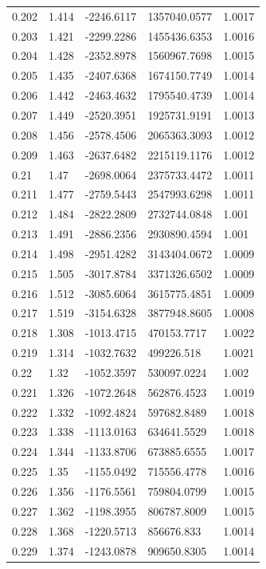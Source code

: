 \begin{tabular}{lllll}
0.202 & 1.414 & -2246.6117 & 1357040.0577 & 1.0017 \\
0.203 & 1.421 & -2299.2286 & 1455436.6353 & 1.0016 \\
0.204 & 1.428 & -2352.8978 & 1560967.7698 & 1.0015 \\
0.205 & 1.435 & -2407.6368 & 1674150.7749 & 1.0014 \\
0.206 & 1.442 & -2463.4632 & 1795540.4739 & 1.0014 \\
0.207 & 1.449 & -2520.3951 & 1925731.9191 & 1.0013 \\
0.208 & 1.456 & -2578.4506 & 2065363.3093 & 1.0012 \\
0.209 & 1.463 & -2637.6482 & 2215119.1176 & 1.0012 \\
0.21 & 1.47 & -2698.0064 & 2375733.4472 & 1.0011 \\
0.211 & 1.477 & -2759.5443 & 2547993.6298 & 1.0011 \\
0.212 & 1.484 & -2822.2809 & 2732744.0848 & 1.001 \\
0.213 & 1.491 & -2886.2356 & 2930890.4594 & 1.001 \\
0.214 & 1.498 & -2951.4282 & 3143404.0672 & 1.0009 \\
0.215 & 1.505 & -3017.8784 & 3371326.6502 & 1.0009 \\
0.216 & 1.512 & -3085.6064 & 3615775.4851 & 1.0009 \\
0.217 & 1.519 & -3154.6328 & 3877948.8605 & 1.0008 \\
0.218 & 1.308 & -1013.4715 & 470153.7717 & 1.0022 \\
0.219 & 1.314 & -1032.7632 & 499226.518 & 1.0021 \\
0.22 & 1.32 & -1052.3597 & 530097.0224 & 1.002 \\
0.221 & 1.326 & -1072.2648 & 562876.4523 & 1.0019 \\
0.222 & 1.332 & -1092.4824 & 597682.8489 & 1.0018 \\
0.223 & 1.338 & -1113.0163 & 634641.5529 & 1.0018 \\
0.224 & 1.344 & -1133.8706 & 673885.6555 & 1.0017 \\
0.225 & 1.35 & -1155.0492 & 715556.4778 & 1.0016 \\
0.226 & 1.356 & -1176.5561 & 759804.0799 & 1.0015 \\
0.227 & 1.362 & -1198.3955 & 806787.8009 & 1.0015 \\
0.228 & 1.368 & -1220.5713 & 856676.833 & 1.0014 \\
0.229 & 1.374 & -1243.0878 & 909650.8305 & 1.0014 \\

\end{tabular}
